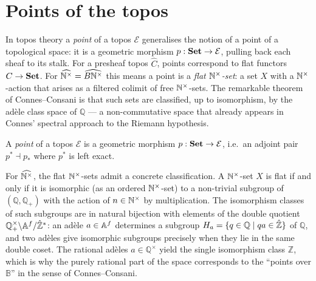 \chapter{Points of the topos}

In topos theory a \emph{point} of a topos $\mathcal{E}$ generalises the
notion of a point of a topological space: it is a geometric morphism
$p : \mathbf{Set} \to \mathcal{E}$, pulling back each sheaf to its stalk.
For a presheaf topos $\widehat{C}$, points correspond to flat functors
$C \to \mathbf{Set}$.  For $\widehat{\mathbb{N}^{\times}} = \widehat{B\mathbb{N}^{\times}}$ this means
a point is a \emph{flat $\mathbb{N}^{\times}$-set}: a set $X$ with a $\mathbb{N}^{\times}$-action
that arises as a filtered colimit of free $\mathbb{N}^{\times}$-sets.  The remarkable
theorem of Connes--Consani is that such sets are classified, up to
isomorphism, by the ad\`ele class space of $\mathbb{Q}$ --- a
non-commutative space that already appears in Connes' spectral approach
to the Riemann hypothesis.

\begin{definition}[label=def:topos_point, uses=def:presheaf_topos]
  \label{def:topos_point}
  A \emph{point} of a topos $\mathcal{E}$ is a geometric morphism
  $p : \mathbf{Set} \to \mathcal{E}$, i.e.\ an adjoint pair
  $p^* \dashv p_*$ where $p^*$ is left exact.
\end{definition}

\begin{remark}
  For $\widehat{\mathbb{N}^{\times}}$, the flat $\mathbb{N}^{\times}$-sets admit a concrete
  classification.  A $\mathbb{N}^{\times}$-set $X$ is flat if and only if it is
  isomorphic (as an ordered $\mathbb{N}^{\times}$-set) to a non-trivial subgroup of
  $(\mathbb{Q}, \mathbb{Q}_+)$ with the action of $n \in \mathbb{N}^{\times}$ by
  multiplication.  The isomorphism classes of such subgroups are in
  natural bijection with elements of the double quotient
  $\mathbb{Q}^{\times}_{+} \backslash \mathbb{A}^{f} / \hat{\mathbb{Z}}^*$: an ad\`ele $a \in \mathbb{A}^{f}$ determines
  a subgroup $H_a = \{ q \in \mathbb{Q} \mid qa \in \hat{\mathbb{Z}} \}$ of
  $\mathbb{Q}$, and two ad\`eles give isomorphic subgroups precisely when
  they lie in the same double coset.  The rational ad\`eles $a \in
  \mathbb{Q}^\times$ yield the single isomorphism class $\mathbb{Z}$,
  which is why the purely rational part of the space corresponds to the
  ``points over $\mathbb{B}$'' in the sense of Connes--Consani.
\end{remark}

